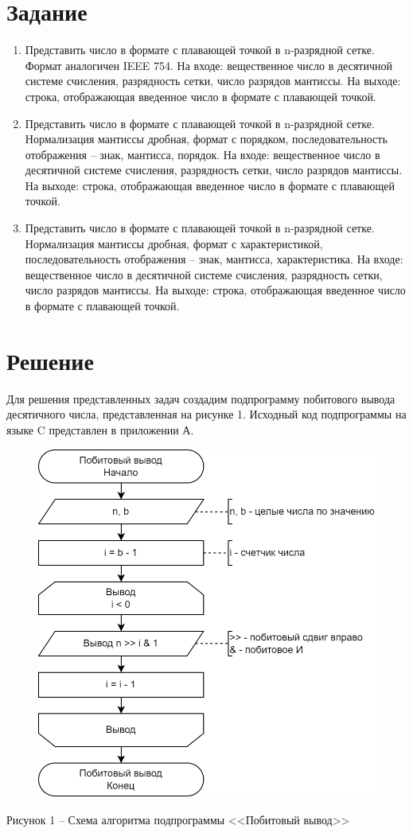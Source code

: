 \documentclass[a4paper,14pt]{extarticle}
\begin{document}
  \section*{Задание}
  \begin{enumerate}
    \item Представить число в формате с плавающей точкой в n-разрядной сетке. Формат аналогичен IEEE 754. На входе: вещественное число в десятичной системе счисления, разрядность сетки, число разрядов мантиссы. На выходе: строка, отображающая введенное число в формате с плавающей точкой.
    
    \item Представить число в формате с плавающей точкой в n-разрядной сетке. Нормализация мантиссы дробная, формат с порядком, последовательность отображения – знак, мантисса, порядок. На входе: вещественное число в десятичной системе счисления, разрядность сетки, число разрядов мантиссы. На выходе: строка, отображающая введенное число в формате с плавающей точкой.
    
    \item Представить число в формате с плавающей точкой в n-разрядной сетке. Нормализация мантиссы дробная, формат с характеристикой, последовательность отображения – знак, мантисса, характеристика. На входе: вещественное число в десятичной системе счисления, разрядность сетки, число разрядов мантиссы. На выходе: строка, отображающая введенное число в формате с плавающей точкой. 
  \end{enumerate}

  \newpage
  \section*{Решение}
  Для решения представленных задач создадим подпрограмму побитового вывода десятичного числа, представленная на рисунке 1. Исходный код подпрограммы на языке C представлен в приложении А.

  \begin{figure}[h]
    \centering
    \includegraphics[width=0.65\linewidth]{schemes/s-p}
  \end{figure}
  \begin{center}
    Рисунок 1 – Схема алгоритма подпрограммы <<Побитовый вывод>>
  \end{center}
\end{document}
